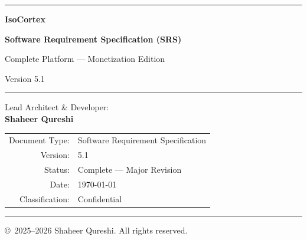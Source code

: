 \documentclass[11pt,a4paper]{article}
\begin{document}
\begin{titlepage}
\centering
\vspace*{1.5cm}

{\color{ctPurple}\rule{\textwidth}{2pt}}

\vspace{1cm}

{\fontsize{48}{56}\selectfont\bfseries\textcolor{ctPurple}{IsoCortex}}

\vspace{0.5cm}

{\Large\textcolor{ctGold}{\bfseries Software Requirement Specification (SRS)}}

\vspace{0.3cm}

{\large\textcolor{ctDarkText}{Complete Platform --- Monetization Edition}}

\vspace{0.3cm}

{\normalsize\textcolor{ctGray}{Version 5.1}}

\vspace{1.5cm}

{\color{ctGold}\rule{0.4\textwidth}{1pt}}

\vspace{1cm}

{\large\textcolor{ctDarkText}{Lead Architect \& Developer:}}\\[0.3cm]
{\LARGE\textbf{\textcolor{ctPurple}{Shaheer Qureshi}}}

\vspace{1.5cm}

\begin{tabular}{rl}
    \textcolor{ctGray}{Document Type:} & Software Requirement Specification \\
    \textcolor{ctGray}{Version:}       & 5.1 \\
    \textcolor{ctGray}{Status:}        & Complete --- Major Revision \\
    \textcolor{ctGray}{Date:}          & \today \\
    \textcolor{ctGray}{Classification:}& Confidential \\
\end{tabular}

\vfill

{\color{ctPurple}\rule{\textwidth}{2pt}}

\vspace{0.5cm}
{\footnotesize\textcolor{ctGray}{\copyright\ 2025--2026 Shaheer Qureshi. All rights reserved.}}
\end{titlepage}
\end{document}
